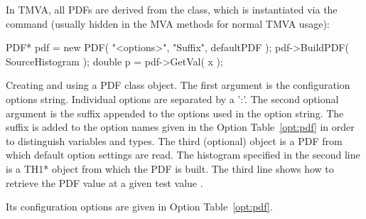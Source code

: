 In TMVA, all PDFs are derived from the  class, which is instantiated via the command
(usually hidden in the MVA methods for normal TMVA usage):
\begin{codeexample}
\begin{tmvacode}
   PDF* pdf = new PDF( "<options>", "Suffix", defaultPDF );
   pdf->BuildPDF( SourceHistogram );
   double p = pdf->GetVal( x );
\end{tmvacode}
\caption[.]{\codeexampleCaptionSize Creating and using a PDF class object.
         The first argument is the configuration options string. Individual options are 
         separated by a ':'. The second optional argument is the suffix appended to the 
         options used in the option string. The suffix is added to the option names 
         given in the Option Table~\ref{opt:pdf} in order to distinguish variables and types. 
         The third (optional) object is a PDF from which default option settings are read. The 
         histogram specified in the second line is a TH1* object from which the PDF is built.
         The third line shows how to retrieve the PDF value at a given test value .
}
\end{codeexample}
Its configuration options are given in Option Table~\ref{opt:pdf}.
